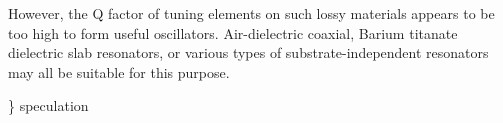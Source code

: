 \documentclass[paper.tex]{subfiles}
\begin{document}
However, the Q factor of tuning elements on such lossy materials appears to be too high to form useful oscillators. Air-dielectric coaxial, Barium titanate dielectric slab resonators, or various types of substrate-independent resonators may all be suitable for this purpose.

{\color{red} \} speculation } 


















\end{document}
